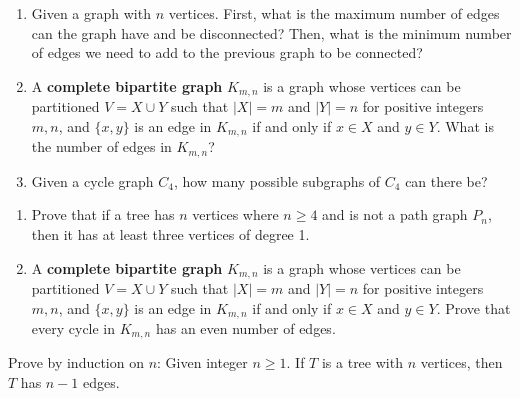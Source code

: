 \documentclass{article}
\theoremstyle{definition}
\begin{document}
\begin{question}
    
\begin{enumerate}
	\item Given a graph with $n$ vertices. First, what is the maximum number of edges can the graph have and be disconnected? Then, what is the minimum number of edges we need to add to the previous graph to be connected?
	\item A \textbf{complete bipartite graph} $K_{m,n}$ is a graph whose vertices can be partitioned $V=X\cup Y$ such that $|X|=m$ and  $|Y|=n$ for positive integers $m,n$, and $\{x, y\}$ is an edge in $K_{m,n}$ if and only if $x\in X$ and $y\in Y$. What is the number of edges in $K_{m,n}$?
	\item Given a cycle graph $C_4$, how many possible subgraphs of $C_4$ can there be?
	\end{enumerate}
\end{question}
\begin{solution}
\end{solution}


\begin{question}
\begin{enumerate}
	\item Prove that if a tree has $n$ vertices where $n\geq 4$ and is not a path graph $P_n$, then it has at least three vertices of degree 1.
	\item A \textbf{complete bipartite graph} $K_{m,n}$ is a graph whose vertices can be partitioned $V=X\cup Y$ such that $|X|=m$ and  $|Y|=n$ for positive integers $m,n$, and $\{x, y\}$ is an edge in $K_{m,n}$ if and only if $x\in X$ and $y\in Y$. Prove that every cycle in $K_{m, n}$ has an even number of edges.
	\end{enumerate}
\end{question}
\begin{solution}
\end{solution}


\begin{question}
    Prove by induction on $n$: Given integer $n\geq 1$. If  $T$ is a tree with $n$ vertices, then $T$ has $n-1$ edges. 
\end{question}
\begin{solution}
\end{solution}
\end{document}
